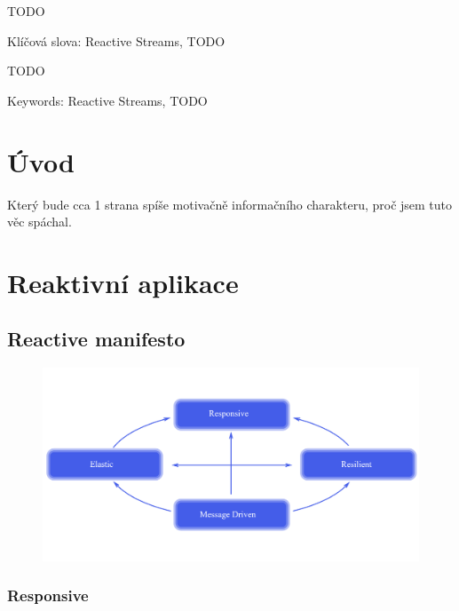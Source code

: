 \documentclass[FM,DP]{tulthesis}
\begin{document}

\begin{abstractCZ}
TODO \Blindtext[2]

Klíčová slova: Reactive Streams, TODO

\end{abstractCZ}

\vspace{2cm}

\begin{abstractEN}
TODO \Blindtext[2]

Keywords: Reactive Streams, TODO

\end{abstractEN}

\tableofcontents

\clearpage

\chapter*{Úvod}
Který bude cca 1 strana spíše motivačně informačního charakteru, proč jsem tuto věc spáchal. \Blindtext[6]

\chapter{Reaktivní aplikace}

\section{Reactive manifesto}

\begin{figure}
\centering
\includegraphics[scale=0.2]{img/reactive-traits}
\end{figure}

\subsection{Responsive}
\end{document}
